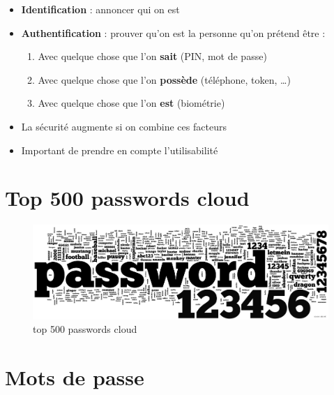 \begin{itemize}
\tightlist
\item
  \textbf{Identification} : annoncer qui on est
\item
  \textbf{Authentification} : prouver qu'on est la personne qu'on
  prétend être :

  \begin{enumerate}
  \def\labelenumi{\arabic{enumi}.}
  \tightlist
  \item
    Avec quelque chose que l'on \textbf{sait} (PIN, mot de passe)
  \item
    Avec quelque chose que l'on \textbf{possède} (téléphone, token,
    \ldots)
  \item
    Avec quelque chose que l'on \textbf{est} (biométrie)
  \end{enumerate}
\item
  La sécurité augmente si on combine ces facteurs
\item
  Important de prendre en compte l'utilisabilité
\end{itemize}

\hypertarget{top-500-passwords-cloud}{%
\section{Top 500 passwords cloud}\label{top-500-passwords-cloud}}

\begin{figure}
\centering
\includegraphics{src/img/passwordscloud.png}
\caption{top 500 passwords cloud}
\end{figure}

\hypertarget{mots-de-passe}{%
\section{Mots de passe}\label{mots-de-passe}}

